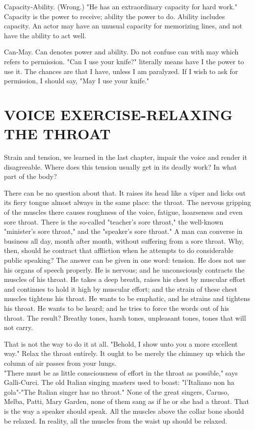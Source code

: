 \documentclass[10pt]{article}
\begin{document}
Capacity-Ability. (Wrong.) "He has an extraordinary capacity for hard work." Capacity is the power to receive; ability the power to do. Ability includes capacity. An actor may have an unusual capacity for memorizing lines, and not have the ability to act well.

Can-May. Can denotes power and ability. Do not confuse can with may which refers to permission. "Can I use your knife?" literally means have I the power to use it. The chances are that I have, unless I am paralyzed. If I wish to ask for permission, I should say, "May I use your knife."

\section*{VOICE EXERCISE-RELAXING THE THROAT}
Strain and tension, we learned in the last chapter, impair the voice and render it disagreeable. Where does this tension usually get in its deadly work? In what part of the body?

There can be no question about that. It raises its head like a viper and licks out its fiery tongue almost always in the same place: the throat. The nervous gripping of the muscles there causes roughness of the voice, fatigue, hoarseness and even sore throat. There is the so-called "teacher's sore throat," the well-known "minister's sore throat," and the "speaker's sore throat." A man can converse in business all day, month after month, without suffering from a sore throat. Why, then, should he contract that affliction when he attempts to do considerable public speaking? The answer can be given in one word: tension. He does not use his organs of speech properly. He is nervous; and he unconsciously contracts the muscles of his throat. He takes a deep breath, raises his chest by muscular effort and continues to hold it high by muscular effort; and the strain of these chest muscles tightens his throat. He wants to be emphatic, and he strains and tightens his throat. He wants to be heard; and he tries to force the words out of his throat. The result? Breathy tones, harsh tones, unpleasant tones, tones that will not carry.

That is not the way to do it at all. "Behold, I show unto you a more excellent way." Relax the throat entirely. It ought to be merely the chimney up which the column of air passes from your lungs.\\
"There must be as little consciousness of effort in the throat as possible," says Galli-Curci. The old Italian singing masters used to boast: "l'Italiano non ha gola"-"The Italian singer has no throat." None of the great singers, Caruso, Melba, Patti, Mary Garden, none of them sang as if he or she had a throat. That is the way a speaker should speak. All the muscles above the collar bone should be relaxed. In reality, all the muscles from the waist up should be relaxed.
\end{document}
